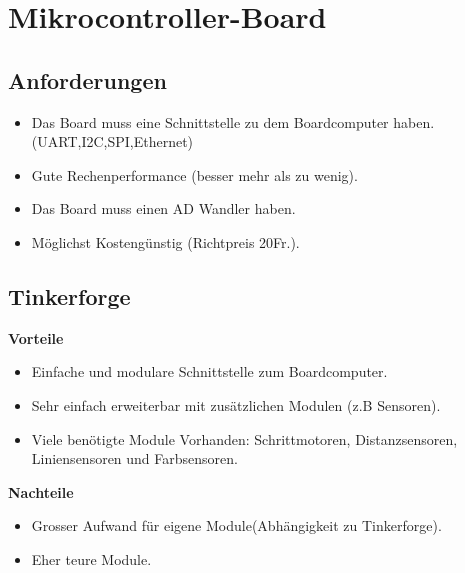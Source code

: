 \section*{Mikrocontroller-Board}
\subsection{Anforderungen}
\begin{itemize}
\item Das Board muss eine Schnittstelle zu dem Boardcomputer haben. (UART,I2C,SPI,Ethernet)
\item Gute Rechenperformance (besser mehr als zu wenig).
\item Das Board muss einen AD Wandler haben.
\item Möglichst Kostengünstig (Richtpreis 20Fr.).
\end{itemize}


\subsection{Tinkerforge}
\textbf {Vorteile}
\begin{itemize}
\item Einfache und modulare Schnittstelle zum Boardcomputer.
\item Sehr einfach erweiterbar mit zusätzlichen Modulen (z.B Sensoren).
\item Viele benötigte Module Vorhanden: Schrittmotoren, Distanzsensoren, Liniensensoren und Farbsensoren.\\
\end{itemize}
\textbf {Nachteile}
\begin{itemize}
\item Grosser Aufwand für eigene Module(Abhängigkeit zu Tinkerforge).
\item Eher teure Module.
\end{itemize}

